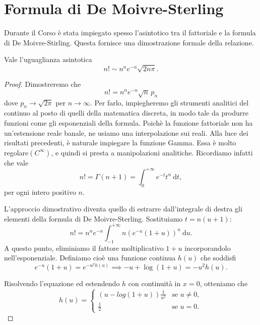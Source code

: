 \chapter{Formula di De Moivre-Sterling}
Durante il Corso è stata impiegato spesso l'asintotico tra il fattoriale e la formula di De Moivre-Stirling. 
Questa fornisce una dimostrazione formale della relazione.
\begin{Res} Vale l'uguaglianza asintotica
	\begin{equation*}
		n! \sim n^n e^{-n} \sqrt{ 2 n \pi }.
	\end{equation*}
\end{Res}
\begin{proof}
	Dimostreremo che
	\begin{equation*}
		n! = n^n e^{-n} \sqrt{n} \, p_n	
	\end{equation*}
	dove $p_n \to \sqrt{ 2 \pi }$ per $n \to \infty$. Per farlo, impiegheremo gli strumenti analitici del continuo al posto di quelli della matematica discreta, in modo tale da produrre funzioni come gli esponenziali della formula.
	Poichè la funzione fattoriale non ha un'estensione reale banale, ne usiamo una interpolazione sui reali. 
	Alla luce dei risultati precedenti, è naturale impiegare la funzione Gamma. 
	Essa è molto regolare$(C^\infty
	)$, e quindi si presta a manipolazioni analitiche. Ricordiamo infatti che vale
	\begin{equation*}
		n! = \Gamma (n+1) = \int^{+\infty}_0 e^{-t} t^n \: \mathrm{d} t,
	\end{equation*}
	per ogni intero positivo $n$.

	L'approccio dimostrativo diventa quello di estrarre dall'integrale di destra gli elementi della formula di De Moivre-Sterling. 
	Sostituiamo $t = n (u+1)$:
	\begin{equation*}
		n! = n^n e^{-n} \int^{+\infty}_{-1}n \left( e^{-u}(1+u) \right)^n \: \mathrm{d} u.
	\end{equation*}
	A questo punto, eliminiamo il fattore moltiplicativo $1+u$ incorporandolo nell'esponenziale. 
	Definiamo cioè una funzione continua $h(u)$ che soddisfi
	\begin{equation}
		\label{res2}
		e^{-u} (1+u) = e^{-u^2 h(u)} \implies -u + \log(1+u) = -u^2 h(u).
	\end{equation}

	Risolvendo l'equazione ed estendendo $h$ con continuità in $x=0$, otteniamo che
	\begin{equation*}
		h(u)=
		\begin{cases}
			(u - log (1+u) ) \frac{1}{u^2} & \text{se } u \neq 0, \\
			\frac{1}{2} & \text{se }  u = 0.
		\end{cases}
	\end{equation*}


\end{proof}
